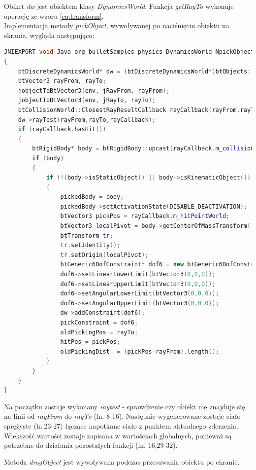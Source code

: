Obiket \emph{dw} jest obiektem klasy \emph{DynamicsWorld}. Funkcja
\emph{getRayTo} wykonuje operację ze wzoru \ref{eq:transform}.\\

Implementacja metody \emph{pickObject}, wywoływanej po naciśnięciu obiektu na
ekranie, wygląda następująco:

\begin{lstlisting}[language=c++, caption=Implementacja
metody pickObject,label=lis:pickObject]
JNIEXPORT void Java_org_bulletSamples_physics_DynamicsWorld_NpickObject( JNIEnv* env, jobject self, jint id, jobject jRayFrom, jobject jRayTo )
{
	btDiscreteDynamicsWorld* dw = (btDiscreteDynamicsWorld*)btObjects::get(id);
	btVector3 rayFrom, rayTo;
	jobjectToBtVector3(env, jRayFrom, rayFrom);
	jobjectToBtVector3(env, jRayTo, rayTo);
	btCollisionWorld::ClosestRayResultCallback rayCallback(rayFrom,rayTo);
	dw->rayTest(rayFrom,rayTo,rayCallback);
	if (rayCallback.hasHit())
	{
		btRigidBody* body = btRigidBody::upcast(rayCallback.m_collisionObject);
		if (body)
		{
			if (!(body->isStaticObject() || body->isKinematicObject()))
			{
				pickedBody = body;
				pickedBody->setActivationState(DISABLE_DEACTIVATION);
				btVector3 pickPos = rayCallback.m_hitPointWorld;
				btVector3 localPivot = body->getCenterOfMassTransform().inverse() * pickPos;
				btTransform tr;
				tr.setIdentity();
				tr.setOrigin(localPivot);
				btGeneric6DofConstraint* dof6 = new btGeneric6DofConstraint(*body, tr,false);
				dof6->setLinearLowerLimit(btVector3(0,0,0));
				dof6->setLinearUpperLimit(btVector3(0,0,0));
				dof6->setAngularLowerLimit(btVector3(0,0,0));
				dof6->setAngularUpperLimit(btVector3(0,0,0));
				dw->addConstraint(dof6);
				pickConstraint = dof6;
				oldPickingPos = rayTo;
				hitPos = pickPos;
				oldPickingDist  = (pickPos-rayFrom).length();
			}
		}
	}
}
\end{lstlisting}

Na początku zostaje wykonany \emph{raytest} - sprawdzenie czy obiekt nie
znajduje się na linii od \emph{rayFrom} do \emph{rayTo} (ln. 8-16). Następnie
wygenerowane zostaje ciało sprężyste (ln.23-27) łączące napotkane ciało z
punktem aktualnego zderzenia. Wiekszość wartości zostaje zapisana w wartościach
globalnych, ponieważ są potrzebne do działania pozostałych funkcji (ln.
16,29-32).

Metoda \emph{dragObject} jest wywoływana podczas przesuwania obiektu po
ekranie.


